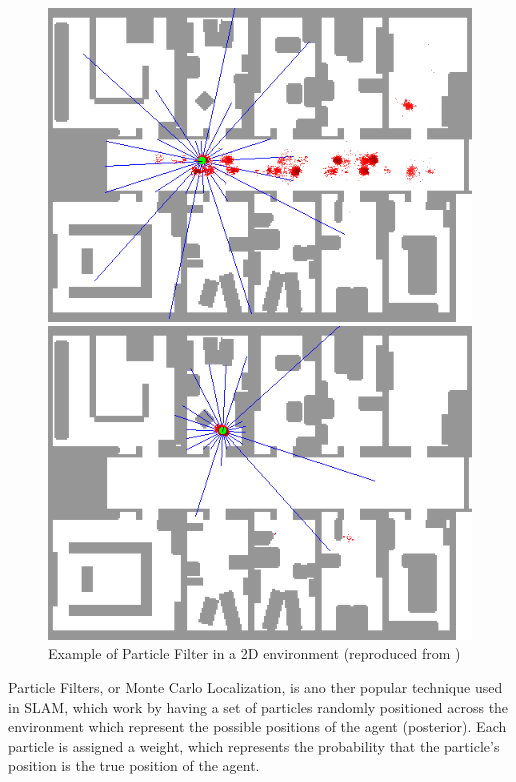 \documentclass[12pt]{article}
\begin{document}
\begin{figure}[h]
\begin{minipage}{0.24\textwidth}
        \includegraphics[width=\linewidth]{frame_07_delay-1s}
    \end{minipage}
    \begin{minipage}{0.24\textwidth}
        \centering
        \includegraphics[width=\linewidth]{frame_25_delay-1s}
    \end{minipage}
    \caption[Short caption]{Example of Particle Filter in a 2D environment (reproduced from \cite{particle_filter})}
    \label{fig:particle_filter}
\end{figure}
Particle Filters, or Monte Carlo Localization, is ano ther popular technique used in SLAM, which work by having a set of particles randomly positioned across the environment which represent the
possible positions of the agent (posterior). Each particle is assigned a weight, which represents the probability that the particle's position is the true position of the agent.
\end{document}
